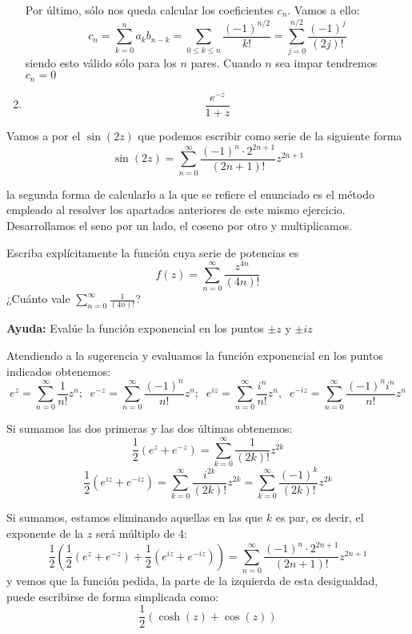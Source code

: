 \begin{problem}[5]
\begin{enumerate}
Por último, sólo nos queda calcular los coeficientes $c_n$. Vamos a ello:
\[c_n = \sum_{k=0}^n a_kb_{n-k} = \sum_{0\leq k \leq n} \frac{(-1)^{n/2}}{k!} = \sum_{j=0}^{n/2} \frac{(-1)^{j}}{(2j)!}\]
siendo esto válido sólo para los $n$ pares. Cuando $n$ sea impar tendremos $c_n=0$


\item
\[\frac{e^{-z}}{1+z}\]


\end{enumerate}

Vamos a por el $\sin(2z)$ que podemos escribir como serie de la siguiente forma
\[\sin(2z) =\sum_{n=0}^{\infty} \frac{(-1)^n\cdot 2^{2n+1}}{(2n+1)!}z^{2n+1}\]

la segunda forma de calcularlo a la que se refiere el enunciado es el método empleado al resolver los apartados anteriores de este mismo ejercicio. Desarrollamos el seno por un lado, el coseno por otro y multiplicamos.

\end{problem}

\begin{problem}[6]
Escriba explícitamente la función cuya serie de potencias es
\[f(z)=\sum_{n=0}^{\infty}\frac{z^{4n}}{(4n)!}\]
¿Cuánto vale $\sum_{n=0}^{\infty} \frac{1}{(4n)!}$?

\textbf{Ayuda:} Evalúe la función exponencial en los puntos $\pm z $ y $\pm iz$
\solution

Atendiendo a la sugerencia y evaluamos la función exponencial en los puntos indicados obtenemos:
\[e^z = \sum_{n=0}^{\infty}\frac{1}{n!}z^n; \; \; e^{-z}=\sum_{n=0}^{\infty} \frac{(-1)^n}{n!}z^n ;\;\; e^{iz} = \sum_{n=0}^{\infty}\frac{i^n}{n!}z^n, \;\; e^{-iz} = \sum_{n=0}^{\infty}\frac{(-1)^ni^n}{n!}z^n\]

Si sumamos las dos primeras y las dos últimas obtenemos:
\[\frac{1}{2}(e^z+e^{-z}) =\sum_{k=0}^{\infty} \frac{1}{(2k)!}z^{2k}\]
\[\frac{1}{2}(e^{iz}+e^{-iz}) =\sum_{k=0}^{\infty} \frac{i^{2k}}{(2k)!}z^{2k}=\sum_{k=0}^{\infty} \frac{(-1)^k}{(2k)!}z^{2k}\]

Si sumamos, estamos eliminando aquellas en las que $k$ es par, es decir, el exponente de la $z$ será múltiplo de 4:
\[\frac{1}{2}\left(\frac{1}{2}(e^z+e^{-z})+\frac{1}{2}(e^{iz}+e^{-iz})\right) = \sum_{n=0}^{\infty} \frac{(-1)^n\cdot 2^{2n+1}}{(2n+1)!}z^{2n+1}\]
y vemos que la función pedida, la parte de la izquierda de esta desigualdad, puede escribirse de forma simplicada como:
\[\frac{1}{2} (\cosh(z) + \cos(z))\]
\end{problem}

